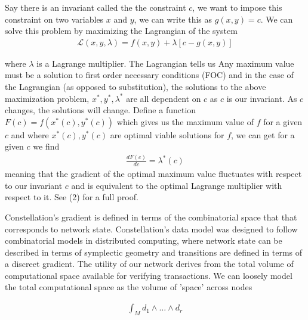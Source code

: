 \documentclass{article}
\begin{document}
Say there is an invariant called the the constraint $c$, we want to impose this constraint on two variables $x$ and $y$, we can write this as $g(x, y) = c$. We can solve this problem by maximizing the Lagrangian of the system
\begin{equation} \label{eq1}
\begin{split}
\mathcal{L}(x, y, \lambda) = f(x, y) + \lambda [c - g(x,y)]
\end{split}
\end{equation}

where $\lambda$ is a Lagrange multiplier. The Lagrangian tells us Any maximum value must be a solution to first order necessary conditions (FOC) and in the case of the Lagrangian (as opposed to substitution), the solutions to the above maximization problem, $x^*, y^*, \lambda^*$ are all dependent on $c$ as $c$ is our invariant. As $c$ changes, the solutions will change. Define a function $F(c) = f(x^*(c), y^*(c))$ which gives us the maximum value of $f$ for a given $c$ and where $x^*(c), y^*(c)$ are optimal viable solutions for $f$, we can get for a given $c$ we find
\begin{equation} \label{eq1}
\begin{split}
\frac{dF(c)}{dc} = \lambda^*(c) 
\end{split}
\end{equation}
meaning that the gradient of the optimal maximum value fluctuates with respect to our invariant $c$ and is equivalent to the optimal Lagrange multiplier with respect to it. See (2) for a full proof.

Constellation's gradient is defined in terms of the combinatorial space that that corresponds to network state. Constellation's data model was designed to follow combinatorial models in distributed computing, where network state can be described in terms of symplectic geometry and transitions are defined in terms of a discreet gradient. The utility of our network derives from the total volume of computational space available for verifying transactions. We can loosely model the total computational space as the volume of 'space' across nodes

\begin{equation*} \label{eq1}
\begin{split}
\int_M d_1\wedge \dots \wedge d_r
\end{split}
\end{equation*}
\end{document}
